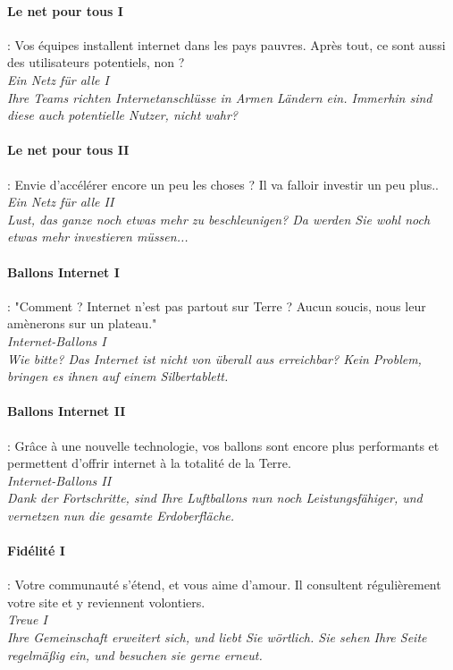 \documentclass[10pt,a4paper]{article}
\begin{document}
\paragraph{Le net pour tous I} : Vos équipes installent internet dans les pays pauvres. Après tout, ce sont aussi des utilisateurs potentiels, non ?\\
\textit{Ein Netz für alle I}\\
\textit{Ihre Teams richten Internetanschlüsse in Armen Ländern ein. Immerhin sind diese auch potentielle Nutzer, nicht wahr?}


\paragraph{Le net pour tous II} : Envie d'accélérer encore un peu les choses ? Il va falloir investir un peu plus..\\
\textit{Ein Netz für alle II}\\
\textit{Lust, das ganze noch etwas mehr zu beschleunigen? Da werden Sie wohl noch etwas mehr investieren müssen...}


\paragraph{Ballons Internet I} : "Comment ? Internet n'est pas partout sur Terre ? Aucun soucis, nous leur amènerons sur un plateau."\\
\textit{Internet-Ballons I}\\
\textit{Wie bitte? Das Internet ist nicht von überall aus erreichbar? Kein Problem, bringen es ihnen auf einem Silbertablett.}


\paragraph{Ballons Internet II} : Grâce à une nouvelle technologie, vos ballons sont encore plus performants et permettent d'offrir internet à la totalité de la Terre.\\
\textit{Internet-Ballons II}\\
\textit{Dank der Fortschritte, sind Ihre Luftballons nun noch Leistungsfähiger, und vernetzen nun die gesamte Erdoberfläche.}


\paragraph{Fidélité I} : Votre communauté s'étend, et vous aime d'amour. Il consultent régulièrement votre site et y reviennent volontiers.\\
\textit{Treue I}\\
\textit{Ihre Gemeinschaft erweitert sich, und liebt Sie wörtlich. Sie sehen Ihre Seite regelmäßig ein, und besuchen sie gerne erneut.}
\end{document}
